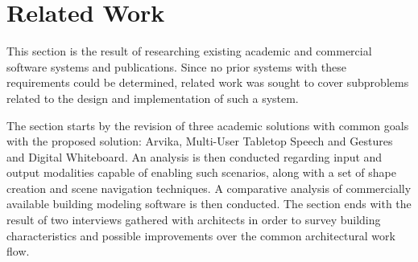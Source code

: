 \chapter{Related Work}

This section is the result of researching existing academic and commercial software systems and publications.
Since no prior systems with these requirements could be determined, related work was sought to cover subproblems
related to the design and implementation of such a system.

The section starts by the revision of three academic solutions with common goals with the proposed solution:
Arvika, Multi-User Tabletop Speech and Gestures and Digital Whiteboard.
An analysis is then conducted regarding input and output modalities capable of enabling such scenarios,
along with a set of shape creation and scene navigation techniques.
A comparative analysis of commercially available building modeling software is then conducted.
The section ends with the result of two interviews gathered with architects in order to survey
building characteristics and possible improvements over the common architectural work flow.






